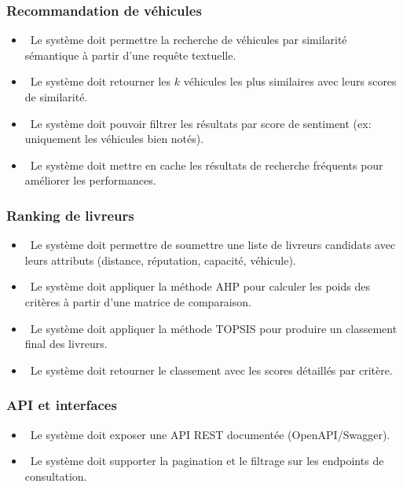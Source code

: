 \documentclass[11pt,a4paper]{report}
\newcommand{\statusok}{\textcolor{arasSuccess}{\faCheckCircle}}
\begin{document}
\subsubsection*{Recommandation de véhicules}

\begin{itemize}
    \item \statusok\ Le système doit permettre la recherche de véhicules par similarité sémantique à partir d'une requête textuelle.
    \item \statusok\ Le système doit retourner les $k$ véhicules les plus similaires avec leurs scores de similarité.
    \item \statusok\ Le système doit pouvoir filtrer les résultats par score de sentiment (ex: uniquement les véhicules bien notés).
    \item \statusok\ Le système doit mettre en cache les résultats de recherche fréquents pour améliorer les performances.
\end{itemize}

\subsubsection*{Ranking de livreurs}

\begin{itemize}
    \item \statusok\ Le système doit permettre de soumettre une liste de livreurs candidats avec leurs attributs (distance, réputation, capacité, véhicule).
    \item \statusok\ Le système doit appliquer la méthode AHP pour calculer les poids des critères à partir d'une matrice de comparaison.
    \item \statusok\ Le système doit appliquer la méthode TOPSIS pour produire un classement final des livreurs.
    \item \statusok\ Le système doit retourner le classement avec les scores détaillés par critère.
\end{itemize}

\subsubsection*{API et interfaces}

\begin{itemize}
    \item \statusok\ Le système doit exposer une API REST documentée (OpenAPI/Swagger).
    \item \statusok\ Le système doit supporter la pagination et le filtrage sur les endpoints de consultation.
\end{itemize}
\end{document}
